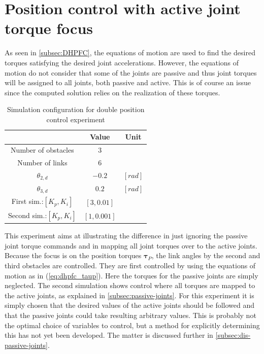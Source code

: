 \section{Position control with active joint torque focus}\label{sec:pas-pos}

As seen in \ref{subsec:DHPFC}, the equations of motion are used to find the desired torques satisfying the desired joint accelerations. However, the equations of motion do not consider that some of the joints are passive and thus joint torques will be assigned to all joints, both passive and active. This is of course an issue since the computed solution relies on the realization of these torques.

\begin{table}[H]
    \centering
    \begin{tabular}{|c|c|c|}
        \hline
        & \textbf{Value} & \textbf{Unit}\\
        \hline \hline
        Number of obstacles & $3$ & \\
        Number of links & $6$ & \\
        $\theta_{2,d}$ & $-0.2$ & $[rad]$ \\
        $\theta_{3,d}$ & $0.2$ & $[rad]$ \\
        First sim.:$[K_{p}, K_{i}]$ & $[3, 0.01]$ &\\
        Second sim.:$[K_{p}, K_{i}]$ & $[1, 0.001]$ &\\
        \hline
    \end{tabular}
    \caption{Simulation configuration for double position control experiment}
    \label{tab:exp_2xp}
\end{table}

This experiment aims at illustrating the difference in just ignoring the passive joint torque commands and in mapping all joint torques over to the active joints. Because the focus is on the position torques $\boldsymbol{\tau}_P$, the link angles by the second and third obstacles are controlled. They are first controlled by using the equations of motion as in (\ref{eq:dhpfc_taup}). Here the torques for the passive joints are simply neglected. The second simulation shows control where all torques are mapped to the active joints, as explained in \ref{subsec:passive-joints}. For this experiment it is simply chosen that the desired values of the active joints should be followed and that the passive joints could take resulting arbitrary values. This is probably not the optimal choice of variables to control, but a method for explicitly determining this has not yet been developed. The matter is discussed further in \ref{subsec:dis-passive-joints}.

